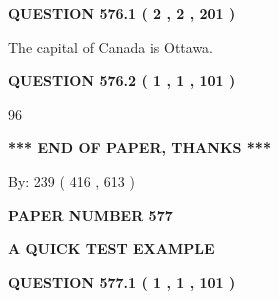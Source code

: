\documentclass[12pt]{article}
\begin{document}
{\textbf{\Large{QUESTION
576.1 
 ( 2 , 2 , 201 )
}}}
  
  
 
 
\noindent{}
 
 
The capital of Canada is Ottawa.
 
 
 
 
  
\vspace{0.2in}
  
{\textbf{\Large{QUESTION
576.2 
 ( 1 , 1 , 101 )
}}}
  
  
 
 
\noindent{}

96
 
 
   
   
 \vspace{0.2in}
 
   
   
   
   
\vspace{1.0in} 
{\textbf{\large{ *** END OF PAPER, THANKS *** }}} 
   
   
\hspace{1.0in} By: 
 239 ( 416 ,  613 )
   
   
   
   
\newpage 
\setcounter{page}{ 
   577001 } 
   
   
   
   
 {\textbf{ \Large{ PAPER NUMBER  577  }}}
   
   
\vspace{0.2in}
   
   
   
   
   
   
 \vspace{0.2in}
{\LARGE {\textbf{ A QUICK TEST EXAMPLE}}}
   
   
  
\vspace{0.2in}
  
{\textbf{\Large{QUESTION
577.1 
 ( 1 , 1 , 101 )
}}}
  
  
 
 
\noindent{}
\end{document}
